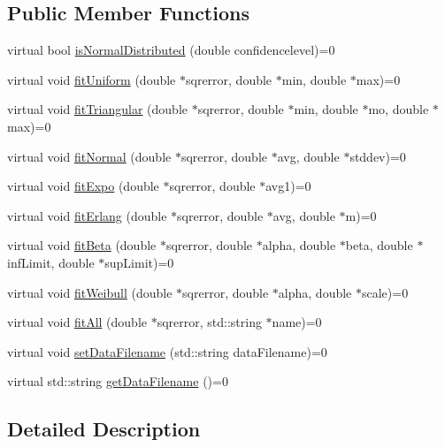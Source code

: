 \subsection*{Public Member Functions}
\begin{DoxyCompactItemize}
\item 
virtual bool \hyperlink{class_fitter__if_a53e98635fcdee314e8ade8089f41ddad}{is\-Normal\-Distributed} (double confidencelevel)=0
\item 
virtual void \hyperlink{class_fitter__if_adec53dfede4bdb31b175e57e6a2c2fc7}{fit\-Uniform} (double $\ast$sqrerror, double $\ast$min, double $\ast$max)=0
\item 
virtual void \hyperlink{class_fitter__if_a2bfc41c6a8044520aeafb2c5c71fe570}{fit\-Triangular} (double $\ast$sqrerror, double $\ast$min, double $\ast$mo, double $\ast$max)=0
\item 
virtual void \hyperlink{class_fitter__if_af95b4de00b7ed5d67b10d9ee458379bf}{fit\-Normal} (double $\ast$sqrerror, double $\ast$avg, double $\ast$stddev)=0
\item 
virtual void \hyperlink{class_fitter__if_a5ab5ac575b736bb720e6a40b334de5a3}{fit\-Expo} (double $\ast$sqrerror, double $\ast$avg1)=0
\item 
virtual void \hyperlink{class_fitter__if_a936e8145a094537dcbe880872453f612}{fit\-Erlang} (double $\ast$sqrerror, double $\ast$avg, double $\ast$m)=0
\item 
virtual void \hyperlink{class_fitter__if_a8ea1e6520f191368274fec5ab8e5f182}{fit\-Beta} (double $\ast$sqrerror, double $\ast$alpha, double $\ast$beta, double $\ast$inf\-Limit, double $\ast$sup\-Limit)=0
\item 
virtual void \hyperlink{class_fitter__if_a40c5bc2e953e683751743cf06df077c6}{fit\-Weibull} (double $\ast$sqrerror, double $\ast$alpha, double $\ast$scale)=0
\item 
virtual void \hyperlink{class_fitter__if_a819a5ca8715ba4be30d2c7a3957aa467}{fit\-All} (double $\ast$sqrerror, std\-::string $\ast$name)=0
\item 
virtual void \hyperlink{class_fitter__if_aa2d2f13548a09a2f727a4190a6b9c2dd}{set\-Data\-Filename} (std\-::string data\-Filename)=0
\item 
virtual std\-::string \hyperlink{class_fitter__if_a3c6926020b1224a960890fe308abcc86}{get\-Data\-Filename} ()=0
\end{DoxyCompactItemize}


\subsection{Detailed Description}



